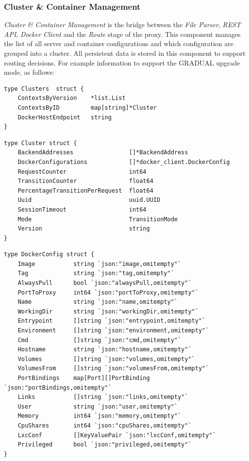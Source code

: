 \documentclass[a4paper,11pt,twoside]{report}
\begin{document}
\subsubsection*{Cluster \& Container Management}
\textit{Cluster \& Container Management} is the bridge between the \textit{File Parser}, \textit{REST API}, \textit{Docker Client} and the \textit{Route} stage of the proxy.  This component manages the list of all server and container configurations and which configuration are grouped into a cluster.  All persistent data is stored in this component to support routing decisions. For example information to support the GRADUAL upgrade mode, as follows: \bigskip  

\begin{lstlisting}[language=terminal]
type Clusters  struct {
	ContextsByVersion    *list.List
	ContextsByID         map[string]*Cluster
	DockerHostEndpoint   string
}
\end{lstlisting}

\begin{lstlisting}[language=terminal]
type Cluster struct {
	BackendAddresses                []*BackendAddress
	DockerConfigurations            []*docker_client.DockerConfig
	RequestCounter                  int64
	TransitionCounter               float64
	PercentageTransitionPerRequest  float64
	Uuid                            uuid.UUID
	SessionTimeout                  int64
	Mode                            TransitionMode
	Version                         string
}
\end{lstlisting}

\begin{lstlisting}[language=terminal]
type DockerConfig struct {
	Image           string `json:"image,omitempty"`
	Tag             string `json:"tag,omitempty"`
	AlwaysPull      bool `json:"alwaysPull,omitempty"`
	PortToProxy     int64 `json:"portToProxy,omitempty"`
	Name            string `json:"name,omitempty"`
	WorkingDir      string `json:"workingDir,omitempty"`
	Entrypoint      []string `json:"entrypoint,omitempty"`
	Environment     []string `json:"environment,omitempty"`
	Cmd             []string `json:"cmd,omitempty"`
	Hostname        string `json:"hostname,omitempty"`
	Volumes         []string `json:"volumes,omitempty"`
	VolumesFrom     []string `json:"volumesFrom,omitempty"`
	PortBindings    map[Port][]PortBinding `json:"portBindings,omitempty"`
	Links           []string `json:"links,omitempty"`
	User            string `json:"user,omitempty"`
	Memory          int64 `json:"memory,omitempty"`
	CpuShares       int64 `json:"cpuShares,omitempty"`
	LxcConf         []KeyValuePair `json:"lxcConf,omitempty"`
	Privileged      bool `json:"privileged,omitempty"`
}
\end{lstlisting} 
\end{document}
